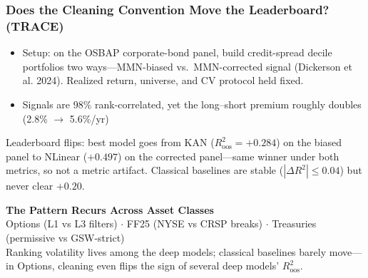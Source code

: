 \documentclass[ignorenonframetext, 9pt]{beamer}
\begin{document}
\begin{frame}
  \frametitle{Does the Cleaning Convention Move the Leaderboard? (TRACE)}
  \begin{itemize}
  \item \alert{Setup:} on the OSBAP corporate-bond panel, build credit-spread decile portfolios two ways---\alert{MMN-biased} vs.\ \alert{MMN-corrected} signal (Dickerson et al. 2024). \alert{Realized return, universe, and CV protocol held fixed.}
  \item Signals are 98\% rank-correlated, yet the long--short premium roughly \alert{doubles} (2.8\% $\to$ 5.6\%/yr)
  \end{itemize}
  \vspace{0.1cm}
  \centering
  \resizebox{0.62\textwidth}{!}{}

  \vspace{0.15cm}
  \footnotesize
  \alert{Leaderboard flips:} best model goes from \alert{KAN} ($R^2_{\text{oos}}{=}{+}0.284$) on the biased panel to \alert{NLinear} (${+}0.497$) on the corrected panel---same winner under both metrics, so not a metric artifact. Classical baselines are stable ($|\Delta R^2|\leq 0.04$) but never clear ${+}0.20$.
\end{frame}

\begin{frame}[plain]
  \tiny
  \vspace{-0.15cm}
  \centering
  \textbf{The Pattern Recurs Across Asset Classes}\\
  {\scriptsize Options (L1 vs L3 filters) $\cdot$ FF25 (NYSE vs CRSP breaks) $\cdot$ Treasuries (permissive vs GSW-strict)}\\
  {\scriptsize Ranking volatility lives among the \alert{deep models}; classical baselines barely move---in Options, cleaning even \alert{flips the sign} of several deep models' $R^2_{\text{oos}}$.}\\
  \vspace{0.05cm}
  \resizebox{0.58\textwidth}{!}{}
\end{frame}
\end{document}
